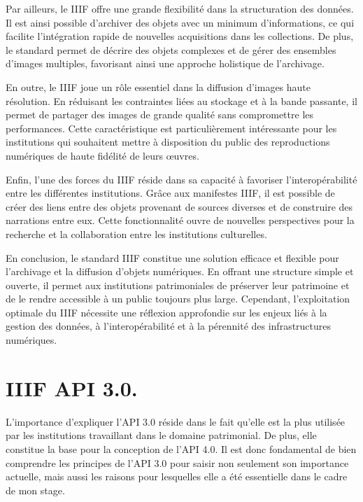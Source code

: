     Par ailleurs, le IIIF offre une grande flexibilité dans la structuration des données. Il est ainsi possible d'archiver des objets avec un minimum d'informations, ce qui facilite l'intégration rapide de nouvelles acquisitions dans les collections. De plus, le standard permet de décrire des objets complexes et de gérer des ensembles d'images multiples, favorisant ainsi une approche holistique de l'archivage.
    
    En outre, le IIIF joue un rôle essentiel dans la diffusion d'images haute résolution. En réduisant les contraintes liées au stockage et à la bande passante, il permet de partager des images de grande qualité sans compromettre les performances. Cette caractéristique est particulièrement intéressante pour les institutions qui souhaitent mettre à disposition du public des reproductions numériques de haute fidélité de leurs œuvres.
    
    Enfin, l'une des forces du IIIF réside dans sa capacité à favoriser l'interopérabilité entre les différentes institutions. Grâce aux manifestes IIIF, il est possible de créer des liens entre des objets provenant de sources diverses et de construire des narrations entre eux. Cette fonctionnalité ouvre de nouvelles perspectives pour la recherche et la collaboration entre les institutions culturelles.
    
    En conclusion, le standard IIIF constitue une solution efficace et flexible pour l'archivage et la diffusion d'objets numériques. En offrant une structure simple et ouverte, il permet aux institutions patrimoniales de préserver leur patrimoine et de le rendre accessible à un public toujours plus large. Cependant, l'exploitation optimale du IIIF nécessite une réflexion approfondie sur les enjeux liés à la gestion des données, à l'interopérabilité et à la pérennité des infrastructures numériques.

    \section{IIIF API 3.0.}
    
    L'importance d'expliquer l'API 3.0 réside dans le fait qu'elle est la plus utilisée par les institutions travaillant dans le domaine patrimonial. De plus, elle constitue la base pour la conception de l'API 4.0. Il est donc fondamental de bien comprendre les principes de l'API 3.0 pour saisir non seulement son importance actuelle, mais aussi les raisons pour lesquelles elle a été essentielle dans le cadre de mon stage.
    
